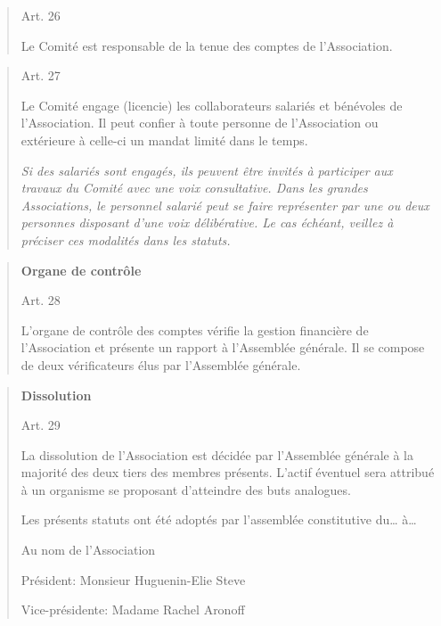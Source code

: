 \documentclass[10pt]{article}
\begin{document}
\begin{quote}
Art. 26

Le Comité est responsable de la tenue des comptes de l'Association.

\end{quote}
\begin{quote}
Art. 27

Le Comité engage (licencie) les collaborateurs salariés et bénévoles de
l'Association. Il peut confier à toute personne de l'Association ou
extérieure à celle-ci un mandat limité dans le temps.

\emph{Si des salariés sont engagés, ils peuvent être invités à
participer aux travaux du Comité avec une voix consultative. Dans les
grandes Associations, le personnel salarié peut se faire représenter par
une ou deux personnes disposant d'une voix délibérative. Le cas échéant,
veillez à préciser ces modalités dans les statuts.}

\end{quote}
\begin{quote}
\textbf{Organe de contrôle}

Art. 28

L'organe de contrôle des comptes vérifie la gestion financière de
l'Association et présente un rapport à l'Assemblée générale. Il se
compose de deux vérificateurs élus par l'Assemblée générale.

\end{quote}
\begin{quote}
\textbf{Dissolution}

Art. 29

La dissolution de l'Association est décidée par l'Assemblée générale à
la majorité des deux tiers des membres présents. L'actif éventuel sera
attribué à un organisme se proposant d'atteindre des buts analogues.

Les présents statuts ont été adoptés par l'assemblée constitutive
du\ldots{} à\ldots{}

Au nom de l'Association

Président: Monsieur Huguenin-Elie Steve

Vice-présidente: Madame Rachel Aronoff
\end{quote}

\end{document}
